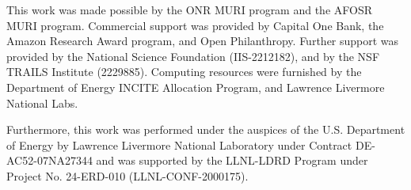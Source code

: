 \documentclass{article}
\newcommand{\nj}[1]{{\textcolor[rgb]{0.505, 0, 0.921}{Neel: \footnotesize\sf[#1]}}}
\begin{document}


\begin{ack}



This work was made possible by the ONR MURI program and the AFOSR MURI program. 
Commercial support was provided by Capital One Bank, the Amazon Research Award program, and Open Philanthropy.
Further support was provided by the National Science Foundation (IIS-2212182), and by the NSF TRAILS Institute (2229885).
Computing resources were furnished by the Department of Energy INCITE Allocation Program, and Lawrence Livermore National Labs. 

Furthermore, this work was performed under the auspices of the U.S. Department of Energy by Lawrence Livermore National Laboratory under Contract DE-AC52-07NA27344 and was supported by the LLNL-LDRD Program under Project No. 24-ERD-010 (LLNL-CONF-2000175).

\end{ack}
\end{document}
